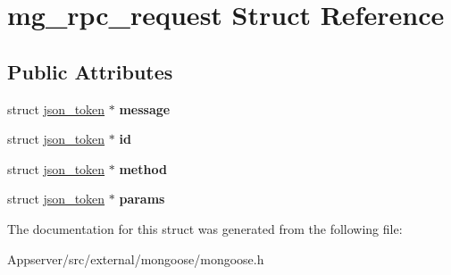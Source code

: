 \hypertarget{structmg__rpc__request}{}\section{mg\+\_\+rpc\+\_\+request Struct Reference}
\label{structmg__rpc__request}
\subsection*{Public Attributes}
\begin{DoxyCompactItemize}
\item 
struct \hyperlink{structjson__token}{json\+\_\+token} $\ast$ {\bfseries message}\hypertarget{structmg__rpc__request_a0cf5da9adcbfcd2b9cf1be06df01bd1d}{}\label{structmg__rpc__request_a0cf5da9adcbfcd2b9cf1be06df01bd1d}

\item 
struct \hyperlink{structjson__token}{json\+\_\+token} $\ast$ {\bfseries id}\hypertarget{structmg__rpc__request_a87d1b86f1cfe9cafd9701e5fcb568aff}{}\label{structmg__rpc__request_a87d1b86f1cfe9cafd9701e5fcb568aff}

\item 
struct \hyperlink{structjson__token}{json\+\_\+token} $\ast$ {\bfseries method}\hypertarget{structmg__rpc__request_a4410f86a4f1d5ec417aea2c20c5447c4}{}\label{structmg__rpc__request_a4410f86a4f1d5ec417aea2c20c5447c4}

\item 
struct \hyperlink{structjson__token}{json\+\_\+token} $\ast$ {\bfseries params}\hypertarget{structmg__rpc__request_ad7e7d66dd02edbbf25765874c74cc7ad}{}\label{structmg__rpc__request_ad7e7d66dd02edbbf25765874c74cc7ad}

\end{DoxyCompactItemize}


The documentation for this struct was generated from the following file\+:\begin{DoxyCompactItemize}
\item 
Appserver/src/external/mongoose/mongoose.\+h\end{DoxyCompactItemize}
